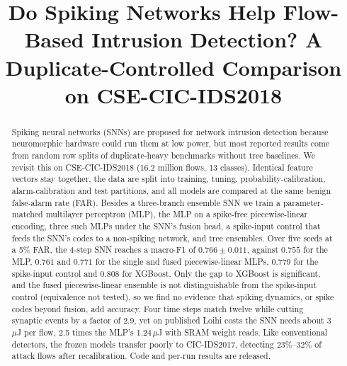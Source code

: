 \documentclass[conference]{IEEEtran}
\begin{document}
\title{Do Spiking Networks Help Flow-Based Intrusion Detection? A Duplicate-Controlled Comparison on CSE-CIC-IDS2018}

\author{
}

\maketitle

\begin{abstract}
Spiking neural networks (SNNs) are proposed for network intrusion detection because neuromorphic hardware could run them at low power, but most reported results come from random row splits of duplicate-heavy benchmarks without tree baselines. We revisit this on CSE-CIC-IDS2018 (16.2 million flows, 13 classes). Identical feature vectors stay together, the data are split into training, tuning, probability-calibration, alarm-calibration and test partitions, and all models are compared at the same benign false-alarm rate (FAR). Besides a three-branch ensemble SNN we train a parameter-matched multilayer perceptron (MLP), the MLP on a spike-free piecewise-linear encoding, three such MLPs under the SNN's fusion head, a spike-input control that feeds the SNN's codes to a non-spiking network, and tree ensembles. Over five seeds at a 5\% FAR, the 4-step SNN reaches a macro-F1 of $0.766 \pm 0.011$, against $0.755$ for the MLP, $0.761$ and $0.771$ for the single and fused piecewise-linear MLPs, $0.779$ for the spike-input control and $0.808$ for XGBoost. Only the gap to XGBoost is significant, and the fused piecewise-linear ensemble is not distinguishable from the spike-input control (equivalence not tested), so we find no evidence that spiking dynamics, or spike codes beyond fusion, add accuracy. Four time steps match twelve while cutting synaptic events by a factor of 2.9, yet on published Loihi costs the SNN needs about 3\,$\mu$J per flow, 2.5 times the MLP's 1.24\,$\mu$J with SRAM weight reads. Like conventional detectors, the frozen models transfer poorly to CIC-IDS2017, detecting 23\%--32\% of attack flows after recalibration. Code and per-run results are released.
\end{abstract}
\end{document}
